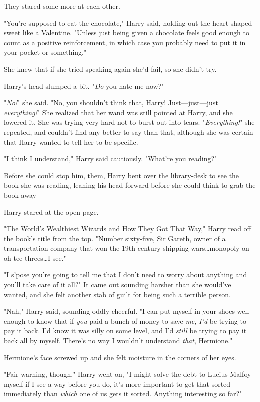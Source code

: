 They stared some more at each other.

"You’re supposed to eat the chocolate," Harry said, holding out the
heart-shaped sweet like a Valentine. "Unless just being given a chocolate feels
good enough to count as a positive reinforcement, in which case you probably
need to put it in your pocket or something."

She knew that if she tried speaking again she’d fail, so she didn’t try.

Harry’s head slumped a bit. "\emph{Do} you hate me now?"

"\emph{No!}" she said. "No, you shouldn’t think that, Harry! Just—just—just
\emph{everything!}" She realized that her wand was still pointed at Harry, and
she lowered it. She was trying very hard not to burst out into tears.
"\emph{Everything!}" she repeated, and couldn’t find any better to say than
that, although she was certain that Harry wanted to tell her to be specific.

"I think I understand," Harry said cautiously. "What’re you reading?"

Before she could stop him, them, Harry bent over the library-desk to see the
book she was reading, leaning his head forward before she could think to grab
the book away—

Harry stared at the open page.

"The World’s Wealthiest Wizards and How They Got That Way," Harry read off the
book’s title from the top. "Number sixty-five, Sir Gareth, owner of a
transportation company that won the 19th-century shipping wars…monopoly
on oh-tee-threes…I see."

"I s’pose you’re going to tell me that I don’t need to worry about anything and
you’ll take care of it all?" It came out sounding harsher than she would’ve
wanted, and she felt another stab of guilt for being such a terrible person.

"Nah," Harry said, sounding oddly cheerful. "I can put myself in your shoes
well enough to know that if \emph{you} paid a bunch of money to save \emph{me,}
\emph{I’d} be trying to pay it back. I’d know it was silly on some level, and I’d
\emph{still} be trying to pay it back all by myself. There’s no way I wouldn’t
understand \emph{that}, Hermione."

Hermione’s face screwed up and she felt moisture in the corners of her eyes.

"Fair warning, though," Harry went on, "I might solve the debt to Lucius Malfoy
myself if I see a way before you do, it’s more important to get that sorted
immediately than \emph{which} one of us gets it sorted. Anything interesting so
far?"

